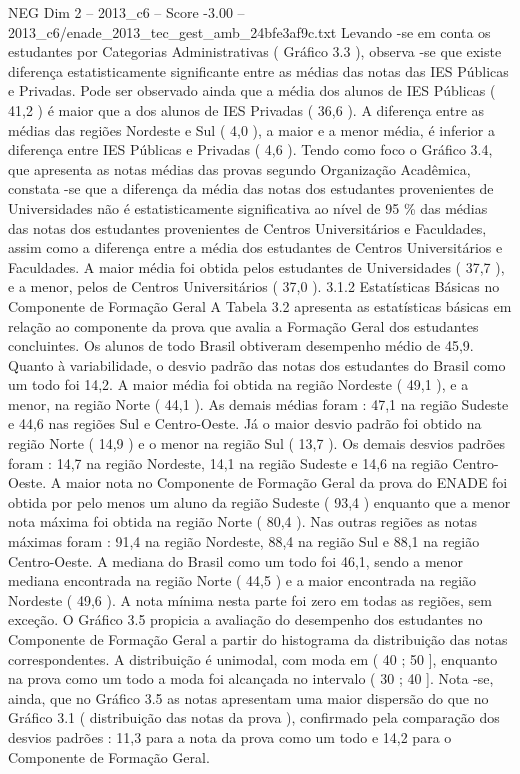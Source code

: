 \begin{textsample}{NEG Dim 2 – 2013\_c6 – Score -3.00 – 2013\_c6/enade\_2013\_tec\_gest\_amb\_24bfe3af9c.txt}
Levando -se em conta os estudantes por Categorias Administrativas ( Gráfico 3.3 ), observa -se que existe diferença estatisticamente significante entre as médias das notas das IES Públicas e Privadas.
Pode ser observado ainda que a média dos alunos de IES Públicas ( 41,2 ) é maior que a dos alunos de IES Privadas ( 36,6 ).
A diferença entre as médias das regiões Nordeste e Sul ( 4,0 ), a maior e a menor média, é inferior a diferença entre IES Públicas e Privadas ( 4,6 ).
Tendo como foco o Gráfico 3.4, que apresenta as notas médias das provas segundo Organização Acadêmica, constata -se que a diferença da média das notas dos estudantes provenientes de Universidades não é estatisticamente significativa ao nível de 95 \% das médias das notas dos estudantes provenientes de Centros Universitários e Faculdades, assim como a diferença entre a média dos estudantes de Centros Universitários e Faculdades.
A maior média foi obtida pelos estudantes de Universidades ( 37,7 ), e a menor, pelos de Centros Universitários ( 37,0 ). 3.1.2 Estatísticas Básicas no Componente de Formação Geral A Tabela 3.2 apresenta as estatísticas básicas em relação ao componente da prova que avalia a Formação Geral dos estudantes concluintes.
Os alunos de todo Brasil obtiveram desempenho médio de 45,9.
Quanto à variabilidade, o desvio padrão das notas dos estudantes do Brasil como um todo foi 14,2.
A maior média foi obtida na região Nordeste ( 49,1 ), e a menor, na região Norte ( 44,1 ).
As demais médias foram : 47,1 na região Sudeste e 44,6 nas regiões Sul e Centro-Oeste.
Já o maior desvio padrão foi obtido na região Norte ( 14,9 ) e o menor na região Sul ( 13,7 ).
Os demais desvios padrões foram : 14,7 na região Nordeste, 14,1 na região Sudeste e 14,6 na região Centro-Oeste.
A maior nota no Componente de Formação Geral da prova do ENADE foi obtida por pelo menos um aluno da região Sudeste ( 93,4 ) enquanto que a menor nota máxima foi obtida na região Norte ( 80,4 ).
Nas outras regiões as notas máximas foram : 91,4 na região Nordeste, 88,4 na região Sul e 88,1 na região Centro-Oeste.
A mediana do Brasil como um todo foi 46,1, sendo a menor mediana encontrada na região Norte ( 44,5 ) e a maior encontrada na região Nordeste ( 49,6 ).
A nota mínima nesta parte foi zero em todas as regiões, sem exceção.
O Gráfico 3.5 propicia a avaliação do desempenho dos estudantes no Componente de Formação Geral a partir do histograma da distribuição das notas correspondentes.
A distribuição é unimodal, com moda em ( 40 ; 50 ], enquanto na prova como um todo a moda foi alcançada no intervalo ( 30 ; 40 ].
Nota -se, ainda, que no Gráfico 3.5 as notas apresentam uma maior dispersão do que no Gráfico 3.1 ( distribuição das notas da prova ), confirmado pela comparação dos desvios padrões : 11,3 para a nota da prova como um todo e 14,2 para o Componente de Formação Geral.

\end{textsample}
